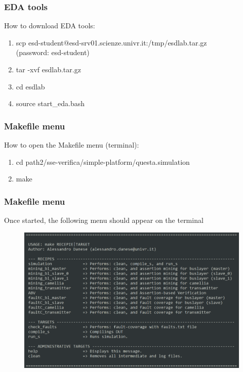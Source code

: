 \documentclass{beamer}
\begin{document}
\begin{frame}
\frametitle{EDA tools}

How to download EDA tools:

\begin{block}{}
\begin{enumerate}
\item
scp esd-student@esd-srv01.scienze.univr.it:/tmp/esdlab.tar.gz\\
(password: esd-student)
\item
tar -xvf esdlab.tar.gz
\item
cd esdlab
\item
source start\_eda.bash
\end{enumerate}
\end{block}

\end{frame}


\begin{frame}

\frametitle{Makefile menu}
How to open the Makefile menu (terminal):
\begin{block}{}
\begin{enumerate}
\item 
cd path2/sse-verifica/simple-platform/questa.simulation
\item
make
\end{enumerate}
\end{block}

\end{frame}


\begin{frame}

\frametitle{Makefile menu}
Once started, the following menu should appear on the terminal

\begin{figure}
\centering
\includegraphics[width=0.9\columnwidth]{figures/makefile_menu.png}
\end{figure}
\end{frame}
\end{document}
